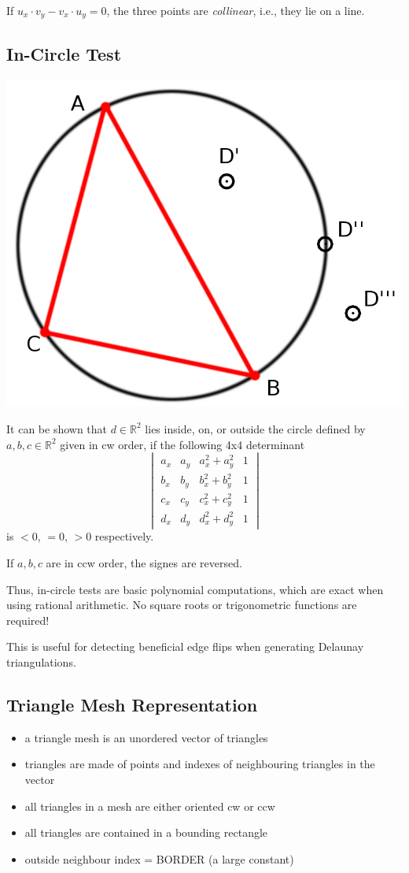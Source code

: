 \documentclass[a4paper,11pt]{article}
\begin{document}
If $u_x \cdot v_y - v_x \cdot u_y = 0$, the three points are \textit{collinear}, i.e., they lie on a line.

\subsection*{In-Circle Test}
\centerline{\includegraphics[width=0.3\linewidth]{circle.png}}

It can be shown that $d \in \mathbb{R}^2$ lies inside, on, or outside the circle
defined by $a,b,c \in \mathbb{R}^2$ given in cw order, if the following 4x4
determinant
\[
\begin{vmatrix}
    a_x & a_y & a_x^2 + a_y^2 & 1 \\
    b_x & b_y & b_x^2 + b_y^2 & 1 \\
    c_x & c_y & c_x^2 + c_y^2 & 1 \\
    d_x & d_y & d_x^2 + d_y^2 & 1 
\end{vmatrix}
\]
is $< 0$, $= 0$, $> 0$ respectively. 

\medskip 

If $a, b, c$ are in ccw order, the signes are reversed.

\medskip 

Thus, in-circle tests are basic polynomial computations, which are exact
when using rational arithmetic. No square roots or trigonometric functions are
required!

\medskip

This is useful for detecting beneficial edge flips when generating Delaunay
triangulations.

\linerule


\subsection*{Triangle Mesh Representation}

\begin{itemize}
    \item a triangle mesh is an unordered vector of triangles
    \item triangles are made of points and indexes of neighbouring triangles in the vector
    \item all triangles in a mesh are either oriented cw or ccw
    \item all triangles are contained in a bounding rectangle
    \item outside neighbour index = BORDER (a large constant)
\end{itemize}
\end{document}
